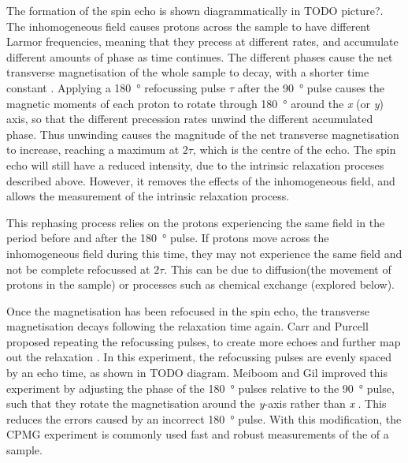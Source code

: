 The formation of the spin echo is shown diagrammatically in TODO picture?.
The inhomogeneous \Bzero field causes protons across the sample to have different Larmor frequencies, meaning that they precess at different rates, and accumulate different amounts of phase as time continues.
The different phases cause the net transverse magnetisation of the whole sample to decay, with a shorter time constant \Ttwostar.
Applying a \SI{180}{\degree} refocussing pulse $\tau$ after the \SI{90}{\degree} pulse causes the magnetic moments of each proton to rotate through \SI{180}{\degree} around the \textit{x} (or \textit{y}) axis, so that the different precession rates unwind the different accumulated phase.
Thus unwinding causes the magnitude of the net transverse magnetisation to increase, reaching a maximum at $2\tau$, which is the centre of the echo.
The spin echo will still have a reduced intensity, due to the intrinsic \Ttwo relaxation proceses described above.
However, it removes the effects of the inhomogeneous \Bzero field, and allows the measurement of the intrinsic \Ttwo relaxation process.

This rephasing process relies on the protons experiencing the same \Bzero field in the period before and after the \SI{180}{\degree} pulse.
If protons move across the inhomogeneous field during this time, they may not experience the same field and not be complete refocussed at $2\tau$.
This can be due to diffusion(the movement of protons in the sample) or processes such as chemical exchange (explored below).

Once the magnetisation has been refocused in the spin echo, the transverse magnetisation decays following the \Ttwostar relaxation time again.
Carr and Purcell proposed repeating the refocussing pulses, to create more echoes and further map out the \Ttwo relaxation \cite{CarrEffectsDiffusionFree1954}.
In this experiment, the refocussing pulses are evenly spaced by an echo time, as shown in TODO diagram.
Meiboom and Gil improved this experiment by adjusting the phase of the \SI{180}{\degree} pulses relative to the \SI{90}{\degree} pulse, such that they rotate the magnetisation around the \textit{y}-axis rather than \textit{x} \cite{MeiboomModifiedSpinEcho1958}.
This reduces the errors caused by an incorrect \SI{180}{\degree} pulse.
With this modification, the CPMG experiment is commonly used fast and robust measurements of the \Ttwo of a sample.

